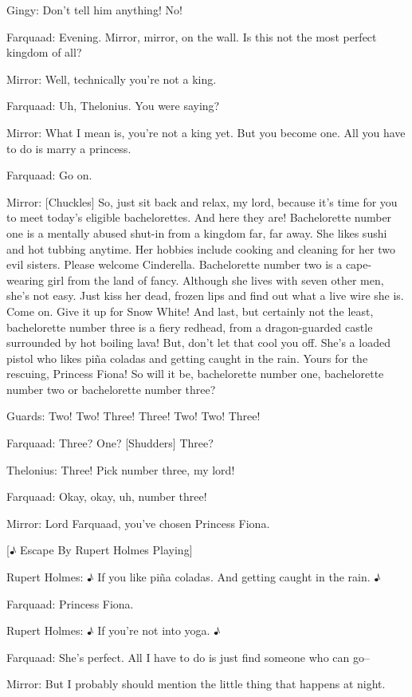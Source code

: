\documentclass{article}
\begin{document}
Gingy:
Don't tell him anything! No!

Farquaad:
Evening. Mirror, mirror, on the wall. Is this not the most perfect kingdom of all?

Mirror:
Well, technically you're not a king.

Farquaad:
Uh, Thelonius. You were saying?

Mirror:
What I mean is, you're not a king yet. But you become one. All you have to do is marry a princess.

Farquaad:
Go on.

Mirror:
[Chuckles] So, just sit back and relax, my lord, because it's time for you to meet today's eligible bachelorettes. And here they are! Bachelorette number one is a mentally abused shut-in from a kingdom far, far away. She likes sushi and hot tubbing anytime. Her hobbies include cooking and cleaning for her two evil sisters. Please welcome Cinderella. Bachelorette number two is a cape-wearing girl from the land of fancy. Although she lives with seven other men, she's not easy. Just kiss her dead, frozen lips and find out what a live wire she is. Come on. Give it up for Snow White! And last, but certainly not the least, bachelorette number three is a fiery redhead, from a dragon-guarded castle surrounded by hot boiling lava! But, don't let that cool you off. She's a loaded pistol who likes piña coladas and getting caught in the rain. Yours for the rescuing, Princess Fiona! So will it be, bachelorette number one, bachelorette number two or bachelorette number three?

Guards:
Two! Two! Three! Three! Two! Two! Three!

Farquaad:
Three? One? [Shudders] Three?

Thelonius:
Three! Pick number three, my lord!

Farquaad:
Okay, okay, uh, number three!

Mirror:
Lord Farquaad, you've chosen Princess Fiona.

[♪ Escape By Rupert Holmes Playing]

Rupert Holmes:
♪ If you like piña coladas. And getting caught in the rain. ♪

Farquaad:
Princess Fiona.

Rupert Holmes:
♪ If you're not into yoga. ♪

Farquaad:
She's perfect. All I have to do is just find someone who can go--

Mirror:
But I probably should mention the little thing that happens at night.
\end{document}

